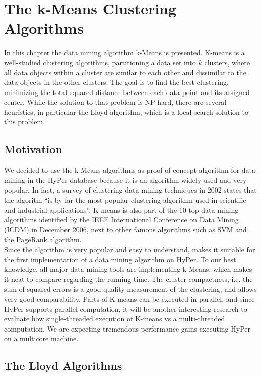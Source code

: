 \chapter{The k-Means Clustering Algorithms}\label{chapter:kmeans}

In this chapter the data mining algorithm k-Means is presented. K-means is a well-studied clustering algorithms, partitioning a data set into $k$ clusters, where all data objects within a cluster are similar to each other and dissimilar to the data objects in the other clusters. The goal is to find the best clustering, minimizing the total squared distance between each data point and its assigned center. While the solution to that problem is NP-hard, there are several heuristics, in particular the Lloyd algorithm, which is a local search solution to this problem.

\section{Motivation}
 
We decided to use the k-Means algorithms as proof-of-concept algorithm for data mining in the HyPer database because it is an algorithm widely used and very popular. In fact, a survey of clustering data mining techniques in 2002 states that the algoritm “is by far the most popular clustering algorithm used in scientific and industrial applications”. K-means is also part of the 10 top data mining algorithms identified by the IEEE International Conference on Data Mining (ICDM) in December 2006, next to other famous algorithms such as SVM and the PageRank algorithm. 
\\
Since the algorithm is very popular and easy to understand, makes it suitable for the first implementation of a data mining algorithm on HyPer. To our best knowledge, all major data mining tools are implementing k-Means, which makes it neat to compare regarding the running time. The cluster compactness, i.e. the sum of squared errors is a good quality measurement of the clustering, and allows very good comparability. 
Parts of K-means can be executed in parallel, and since HyPer supports parallel computation, it will be another interesting research to evaluate how single-threaded execution of K-means vs a multi-threaded computation. We are expecting tremendous performance gains executing HyPer on a multicore machine.

\section{The Lloyd Algorithms}

